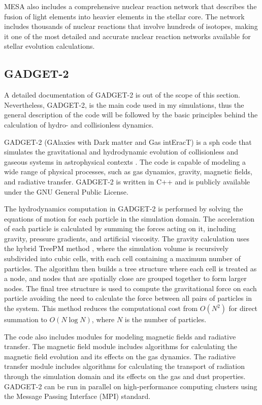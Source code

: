 MESA also includes a comprehensive nuclear reaction network that describes the fusion of light elements into heavier elements in the stellar core. The network includes thousands of nuclear reactions that involve hundreds of isotopes, making it one of the most detailed and accurate nuclear reaction networks available for stellar evolution calculations.


\subsection{GADGET-2}\label{sub:gadget2}

A detailed documentation of GADGET-2 is out of the scope of this section. Nevertheless, GADGET-2, is the main code used in my simulations, thus the general description of the code will be followed by the basic principles behind the calculation of hydro- and collisionless dynamics.

GADGET-2 (GAlaxies with Dark matter and Gas intEracT) is a \ac{sph} code that simulates the gravitational and hydrodynamic evolution of collisionless and gaseous systems in astrophysical contexts \citep{springel2005cosmological}. The code is capable of modeling a wide range of physical processes, such as gas dynamics, gravity, magnetic fields, and radiative transfer. GADGET-2 is written in C++ and is publicly available under the GNU General Public License.

The hydrodynamics computation in GADGET-2 is performed by solving the equations of motion for each particle in the simulation domain. The acceleration of each particle is calculated by summing the forces acting on it, including gravity, pressure gradients, and artificial viscosity. The gravity calculation uses the hybrid TreePM method \citep{bode2000tree,bagla2002treepm}, where the simulation volume is recursively subdivided into cubic cells, with each cell containing a maximum number of particles. The algorithm then builds a tree structure where each cell is treated as a node, and nodes that are spatially close are grouped together to form larger nodes. The final tree structure is used to compute the gravitational force on each particle avoiding the need to calculate the force between all pairs of particles in the system. This method reduces the computational cost from $O(N^2)$ for direct summation to $O(N\log N)$, where $N$ is the number of particles.

The code also includes modules for modeling magnetic fields and radiative transfer. The magnetic field module includes algorithms for calculating the magnetic field evolution and its effects on the gas dynamics. The radiative transfer module includes algorithms for calculating the transport of radiation through the simulation domain and its effects on the gas and dust properties. GADGET-2 can be run in parallel on high-performance computing clusters using the Message Passing Interface (MPI) standard.

